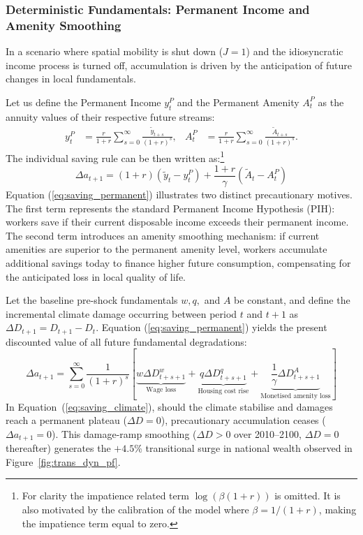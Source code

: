 \documentclass[11pt, a4paper]{article}
\begin{document}
\subsubsection*{Deterministic Fundamentals: Permanent Income and Amenity Smoothing}
In a scenario where spatial mobility is shut down ($J=1$) and the idiosyncratic income process is turned off, accumulation is driven by the anticipation of future changes in local fundamentals.  

Let us define the Permanent Income $y_t^P$ and the Permanent Amenity $A_t^P$ as the annuity values of their respective future streams:
\begin{align}
    y_t^P &= \frac{r}{1+r} \sum_{s=0}^{\infty} \frac{\tilde{y}_{t+s}}{(1+r)^s}, &
    A_t^P &= \frac{r}{1+r} \sum_{s=0}^{\infty} \frac{\tilde{A}_{t+s}}{(1+r)^s}. \label{eq:perm_income}
\end{align}
The individual saving rule can be then written as:\footnote{For clarity the impatience related term $\log(\beta(1+r))$ is omitted. It is also motivated by the calibration of the model where $\beta = 1/(1+r)$, making the impatience term equal to zero.}
\begin{equation}
    \Delta a_{t+1} = (1+r) \left( \tilde{y}_t - y_t^P \right) + \frac{1+r}{\gamma} \left( \tilde{A}_t - A_t^P \right)
    \label{eq:saving_permanent}
\end{equation}
Equation (\ref{eq:saving_permanent}) illustrates two distinct precautionary motives. The first term represents the standard Permanent Income Hypothesis (PIH): workers save if their current disposable income exceeds their permanent income. The second term introduces an amenity smoothing mechanism: if current amenities are superior to the permanent amenity level, workers accumulate additional savings today to finance higher future consumption, compensating for the anticipated loss in local quality of life. 

Let the baseline pre-shock fundamentals $w, q,$ and $A$ be constant, and define the incremental climate damage occurring between period $t$ and $t+1$ as $\Delta D_{t+1} = D_{t+1} - D_t$. Equation (\ref{eq:saving_permanent}) yields the present discounted value of all future fundamental degradations:
\begin{equation}
    \Delta a_{t+1} = \sum_{s=0}^{\infty} \frac{1}{(1+r)^s} \left[ \underbrace{w \Delta D^w_{t+s+1}}_{\text{Wage loss}} + \underbrace{q \Delta D^q_{t+s+1}}_{\text{Housing cost rise}} + \underbrace{\frac{1}{\gamma} \Delta D^A_{t+s+1}}_{\text{Monetised amenity loss}} \right]
    \label{eq:saving_climate}
\end{equation}
In Equation~(\ref{eq:saving_climate}), should the climate stabilise and damages reach a permanent plateau ($\Delta D = 0$), precautionary accumulation ceases ($\Delta a_{t+1} = 0$). This damage-ramp smoothing ($\Delta D > 0$ over 2010--2100, $\Delta D = 0$ thereafter) generates the $+4.5$\% transitional surge in national wealth observed in Figure~\ref{fig:trans_dyn_pf}.
\end{document}

